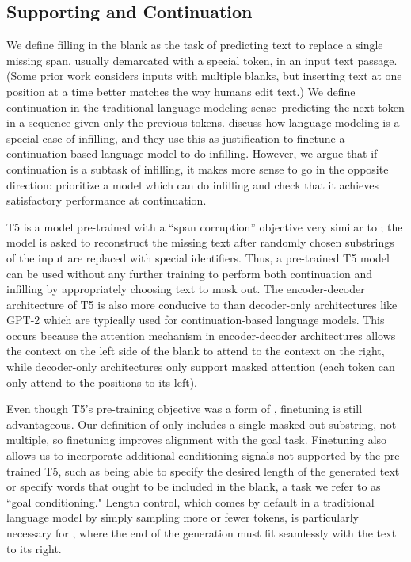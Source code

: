 \subsection{Supporting \FitB{} and Continuation}
\label{section:fitb_fite_methods}
We define filling in the blank as the task of predicting text to replace a single missing span, usually demarcated with a special token, in an input text passage. (Some prior work considers inputs with multiple blanks, but inserting text at one position at a time better matches the way humans edit text.)
We define continuation in the traditional language modeling sense--predicting the next token in a sequence given only the previous tokens.
\citet{donahue2020enabling} discuss how language modeling is a special case of infilling, and they use this as justification to finetune a continuation-based language model to do infilling.
However, we argue that if continuation is a subtask of infilling, it makes more sense to go in the opposite direction: prioritize a model which can do infilling and check that it achieves satisfactory performance at continuation.

T5 is a model pre-trained with a ``span corruption'' objective very similar to \FitB; the model is asked to reconstruct the missing text after randomly chosen substrings of the input are replaced with special identifiers.
Thus, a pre-trained T5 model can be used without any further training to perform both continuation and infilling by appropriately choosing text to mask out.
The encoder-decoder architecture of T5 is also more conducive to \FitB{} than decoder-only architectures like GPT-2 \citep{radford2019language} which are typically used for continuation-based language models.
This occurs because the attention mechanism in encoder-decoder architectures allows the context on the left side of the blank to attend to the context on the right, while decoder-only architectures only support masked attention (each token can only attend to the positions to its left).

Even though T5's pre-training objective was a form of \FitB, finetuning is still advantageous.
Our definition of \FitB{} only includes a single masked out substring, not multiple, so finetuning improves alignment with the goal task.
Finetuning also allows us to incorporate additional conditioning signals not supported by the pre-trained T5, such as being able to specify the desired length of the generated text or specify words that ought to be included in the blank, a task we refer to as ``goal conditioning."
Length control, which comes by default in a traditional language model
by simply sampling more or fewer
tokens, is particularly necessary for \FitB, where the end of the generation must fit seamlessly with the text to its right.

